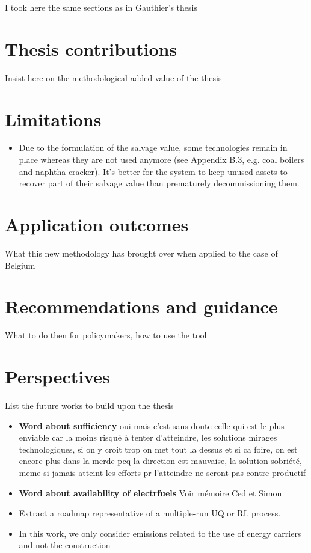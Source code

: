 I took here the same sections as in Gauthier's thesis
\section*{Thesis contributions}
Insist here on the methodological added value of the thesis

\section*{Limitations}
\begin{itemize}
\item Due to the formulation of the salvage value, some technologies remain in place whereas they are not used anymore (see Appendix B.3, e.g. coal boilers and naphtha-cracker). It's better for the system to keep unused assets to recover part of their salvage value than prematurely decommissioning them.
\end{itemize}

\section*{Application outcomes}
What this new methodology has brought over when applied to the case of Belgium

\section*{Recommendations and guidance}
What to do then for policymakers, how to use the tool

\section*{Perspectives}
List the future works to build upon the thesis

\begin{itemize}
\item \textbf{Word about sufficiency} oui mais c'est sans doute celle qui est le plus enviable car la moins risqué à tenter d'atteindre, les solutions mirages technologiques, si on y croit trop on met tout la dessus et si ca foire, on est encore plus dans la merde pcq la direction est mauvaise, la solution sobriété, meme si jamais atteint les efforts pr l'atteindre ne seront pas contre productif
\item \textbf{Word about availability of electrfuels} Voir mémoire Ced et Simon
\item Extract a roadmap representative of a multiple-run UQ or RL process.
\item In this work, we only consider emissions related to the use of energy carriers and not the construction
\end{itemize}


